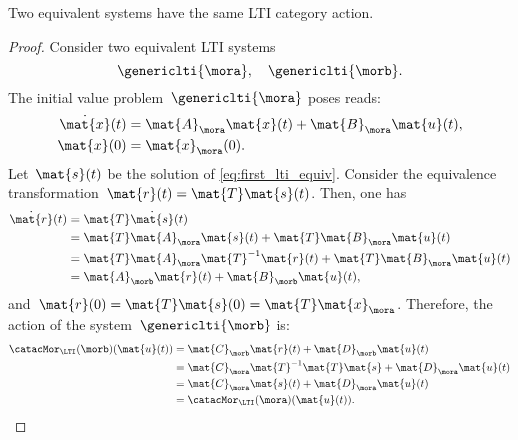 \begin{lemma}
    Two equivalent systems have the same LTI category action.
\end{lemma}
\begin{proof}
    Consider two equivalent LTI systems
    \begin{equation*}
        \genericlti{\mora},\quad \genericlti{\morb}.
    \end{equation*}
    The initial value problem~$\genericlti{\mora}$ poses reads:
    \begin{equation}
        \label{eq:first_lti_equiv}
        \begin{aligned}
            \dot{\mat{x}}(t) & =\mat{A}_{\mora}\mat{x}(t)+\mat{B}_{\mora}\mat{u}(t), \\
            \mat{x}(0)       & =\mat{x}_\mora(0).
        \end{aligned}
    \end{equation}
    Let~$\mat{s}(t)$ be the solution of \cref{eq:first_lti_equiv}.
    Consider the equivalence transformation~$\mat{r}(t)=\mat{T}\mat{s}(t)$.
    Then, one has
    \begin{equation*}
        \begin{aligned}
            \dot{\mat{r}}(t) & =\mat{T}\dot{\mat{s}}(t) \\
                             & =\mat{T}\mat{A}_\mora \mat{s}(t)+\mat{T}\mat{B}_\mora \mat{u}(t) \\
                             & =\mat{T}\mat{A}_\mora \mat{T}^{-1}\mat{r}(t)+\mat{T}\mat{B}_\mora \mat{u}(t) \\
                             & =\mat{A}_\morb\mat{r}(t)+\mat{B}_\morb \mat{u}(t),
        \end{aligned}
    \end{equation*}
    and~$\mat{r}(0)=\mat{T}\mat{s}(0)=\mat{T}\mat{x}_\mora$.
    Therefore, the action of the system~$\genericlti{\morb}$ is:
    \begin{equation*}
        \begin{aligned}
            \catacMor_\LTI(\morb)(\mat{u}(t)) & =\mat{C}_\morb \mat{r}(t)+ \mat{D}_\morb \mat{u}(t) \\
                                              & =\mat{C}_\mora \mat{T}^{-1}\mat{T}\mat{s}+\mat{D}_\mora \mat{u}(t) \\
                                              & =\mat{C}_\mora \mat{s}(t)+\mat{D}_\mora \mat{u}(t) \\
                                              & =\catacMor_\LTI(\mora)(\mat{u}(t)).
        \end{aligned}
    \end{equation*}
\end{proof}

